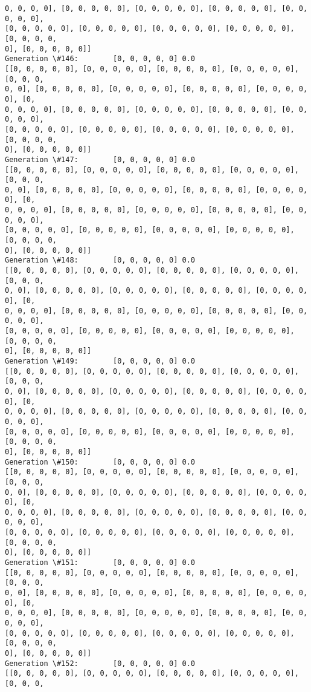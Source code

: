 \documentclass[11pt]{article}
\begin{document}
\begin{Verbatim}[commandchars=\\\{\}]
0, 0, 0, 0], [0, 0, 0, 0, 0], [0, 0, 0, 0, 0], [0, 0, 0, 0, 0], [0, 0, 0, 0, 0],
[0, 0, 0, 0, 0], [0, 0, 0, 0, 0], [0, 0, 0, 0, 0], [0, 0, 0, 0, 0], [0, 0, 0, 0,
0], [0, 0, 0, 0, 0]]
Generation \#146:        [0, 0, 0, 0, 0] 0.0
[[0, 0, 0, 0, 0], [0, 0, 0, 0, 0], [0, 0, 0, 0, 0], [0, 0, 0, 0, 0], [0, 0, 0,
0, 0], [0, 0, 0, 0, 0], [0, 0, 0, 0, 0], [0, 0, 0, 0, 0], [0, 0, 0, 0, 0], [0,
0, 0, 0, 0], [0, 0, 0, 0, 0], [0, 0, 0, 0, 0], [0, 0, 0, 0, 0], [0, 0, 0, 0, 0],
[0, 0, 0, 0, 0], [0, 0, 0, 0, 0], [0, 0, 0, 0, 0], [0, 0, 0, 0, 0], [0, 0, 0, 0,
0], [0, 0, 0, 0, 0]]
Generation \#147:        [0, 0, 0, 0, 0] 0.0
[[0, 0, 0, 0, 0], [0, 0, 0, 0, 0], [0, 0, 0, 0, 0], [0, 0, 0, 0, 0], [0, 0, 0,
0, 0], [0, 0, 0, 0, 0], [0, 0, 0, 0, 0], [0, 0, 0, 0, 0], [0, 0, 0, 0, 0], [0,
0, 0, 0, 0], [0, 0, 0, 0, 0], [0, 0, 0, 0, 0], [0, 0, 0, 0, 0], [0, 0, 0, 0, 0],
[0, 0, 0, 0, 0], [0, 0, 0, 0, 0], [0, 0, 0, 0, 0], [0, 0, 0, 0, 0], [0, 0, 0, 0,
0], [0, 0, 0, 0, 0]]
Generation \#148:        [0, 0, 0, 0, 0] 0.0
[[0, 0, 0, 0, 0], [0, 0, 0, 0, 0], [0, 0, 0, 0, 0], [0, 0, 0, 0, 0], [0, 0, 0,
0, 0], [0, 0, 0, 0, 0], [0, 0, 0, 0, 0], [0, 0, 0, 0, 0], [0, 0, 0, 0, 0], [0,
0, 0, 0, 0], [0, 0, 0, 0, 0], [0, 0, 0, 0, 0], [0, 0, 0, 0, 0], [0, 0, 0, 0, 0],
[0, 0, 0, 0, 0], [0, 0, 0, 0, 0], [0, 0, 0, 0, 0], [0, 0, 0, 0, 0], [0, 0, 0, 0,
0], [0, 0, 0, 0, 0]]
Generation \#149:        [0, 0, 0, 0, 0] 0.0
[[0, 0, 0, 0, 0], [0, 0, 0, 0, 0], [0, 0, 0, 0, 0], [0, 0, 0, 0, 0], [0, 0, 0,
0, 0], [0, 0, 0, 0, 0], [0, 0, 0, 0, 0], [0, 0, 0, 0, 0], [0, 0, 0, 0, 0], [0,
0, 0, 0, 0], [0, 0, 0, 0, 0], [0, 0, 0, 0, 0], [0, 0, 0, 0, 0], [0, 0, 0, 0, 0],
[0, 0, 0, 0, 0], [0, 0, 0, 0, 0], [0, 0, 0, 0, 0], [0, 0, 0, 0, 0], [0, 0, 0, 0,
0], [0, 0, 0, 0, 0]]
Generation \#150:        [0, 0, 0, 0, 0] 0.0
[[0, 0, 0, 0, 0], [0, 0, 0, 0, 0], [0, 0, 0, 0, 0], [0, 0, 0, 0, 0], [0, 0, 0,
0, 0], [0, 0, 0, 0, 0], [0, 0, 0, 0, 0], [0, 0, 0, 0, 0], [0, 0, 0, 0, 0], [0,
0, 0, 0, 0], [0, 0, 0, 0, 0], [0, 0, 0, 0, 0], [0, 0, 0, 0, 0], [0, 0, 0, 0, 0],
[0, 0, 0, 0, 0], [0, 0, 0, 0, 0], [0, 0, 0, 0, 0], [0, 0, 0, 0, 0], [0, 0, 0, 0,
0], [0, 0, 0, 0, 0]]
Generation \#151:        [0, 0, 0, 0, 0] 0.0
[[0, 0, 0, 0, 0], [0, 0, 0, 0, 0], [0, 0, 0, 0, 0], [0, 0, 0, 0, 0], [0, 0, 0,
0, 0], [0, 0, 0, 0, 0], [0, 0, 0, 0, 0], [0, 0, 0, 0, 0], [0, 0, 0, 0, 0], [0,
0, 0, 0, 0], [0, 0, 0, 0, 0], [0, 0, 0, 0, 0], [0, 0, 0, 0, 0], [0, 0, 0, 0, 0],
[0, 0, 0, 0, 0], [0, 0, 0, 0, 0], [0, 0, 0, 0, 0], [0, 0, 0, 0, 0], [0, 0, 0, 0,
0], [0, 0, 0, 0, 0]]
Generation \#152:        [0, 0, 0, 0, 0] 0.0
[[0, 0, 0, 0, 0], [0, 0, 0, 0, 0], [0, 0, 0, 0, 0], [0, 0, 0, 0, 0], [0, 0, 0,

\end{Verbatim}
\end{document}

